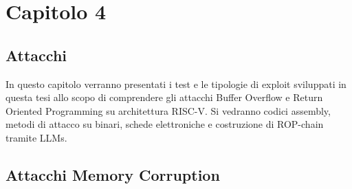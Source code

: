 \chapter*{Capitolo 4}


\section*{Attacchi}
In questo capitolo verranno presentati i test e le tipologie di exploit sviluppati in questa tesi allo scopo di comprendere gli attacchi Buffer Overflow e Return Oriented Programming su architettura RISC-V. Si vedranno codici assembly, metodi di attacco su binari, schede elettroniche e costruzione di ROP-chain tramite LLMs.
\section*{Attacchi Memory Corruption}
